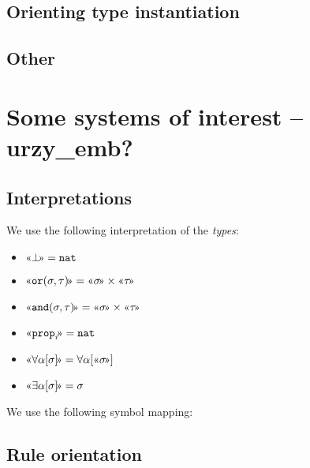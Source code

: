 \documentclass[runningheads,a4paper]{llncs}
\newcommand{\quant}[2]{\forall #1[#2]}
\newcommand{\qquant}[3]{#1 #2[#3]}
\newcommand{\typeinterpret}[1]{\text{\guillemotleft} #1\! \text{\guillemotright}}
\newcommand{\nat}{\mathtt{nat}}
\begin{document}
\subsection{Orienting type instantiation}

\subsection{Other}

\section{Some systems of interest -- urzy\_emb?}

\subsection{Interpretations}

We use the following interpretation of the \emph{types}:

\begin{itemize}
\item $\typeinterpret{\bot} = \nat$
\item $\typeinterpret{\mathtt{or}(\sigma,\tau)} =
  \typeinterpret{\sigma} \times \typeinterpret{\tau}$
\item $\typeinterpret{\mathtt{and}(\sigma,\tau)} =
  \typeinterpret{\sigma} \times \typeinterpret{\tau}$
\item $\typeinterpret{\mathtt{prop}_i} = \nat$
\item $\typeinterpret{\quant{\alpha}{\sigma}} =
  \quant{\alpha}{\typeinterpret{\sigma}}$
\item $\typeinterpret{\qquant{\exists}{\alpha}{\sigma}} = \sigma$
\end{itemize}

We use the following symbol mapping:

\subsection{Rule orientation}
\end{document}
